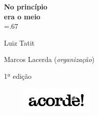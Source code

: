 




\begingroup\thispagestyle{empty}\vspace*{.05\textheight}\parindent=0pt 
              \formular
              \huge 
              \textbf{No princípio\\era o meio}\\\baselineskip=.67\baselineskip 

              \medskip
              
              \LARGE
              Luiz Tatit
              
              \vspace{4cm}              

              \newfontfamily{}
              {\selectfont\minion\small Marcos Lacerda (\textit{organização})}
              

              {\selectfont\minion\footnotesize
              1ª edição}
                    
              \vfill
              
              \begin{figure}
              \vspace*{-1.22\baselineskip}
              \includegraphics[width=3.5cm]{./logoacorde.png}
              \end{figure}

